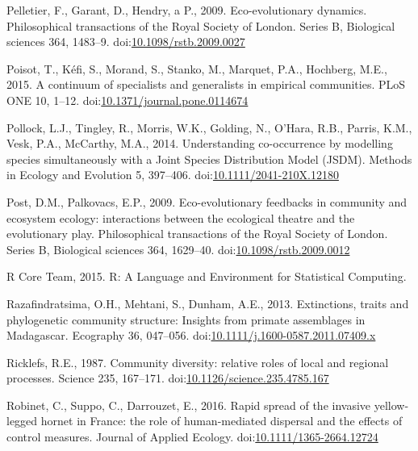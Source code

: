 \hypertarget{ref-Pelletier2009}{}
Pelletier, F., Garant, D., Hendry, a P., 2009. Eco-evolutionary
dynamics. Philosophical transactions of the Royal Society of London.
Series B, Biological sciences 364, 1483--9.
doi:\href{https://doi.org/10.1098/rstb.2009.0027}{10.1098/rstb.2009.0027}

\hypertarget{ref-Poisot2015c}{}
Poisot, T., Kéfi, S., Morand, S., Stanko, M., Marquet, P.A., Hochberg,
M.E., 2015. A continuum of specialists and generalists in empirical
communities. PLoS ONE 10, 1--12.
doi:\href{https://doi.org/10.1371/journal.pone.0114674}{10.1371/journal.pone.0114674}

\hypertarget{ref-Pollock2014}{}
Pollock, L.J., Tingley, R., Morris, W.K., Golding, N., O'Hara, R.B.,
Parris, K.M., Vesk, P.A., McCarthy, M.A., 2014. Understanding
co-occurrence by modelling species simultaneously with a Joint Species
Distribution Model (JSDM). Methods in Ecology and Evolution 5, 397--406.
doi:\href{https://doi.org/10.1111/2041-210X.12180}{10.1111/2041-210X.12180}

\hypertarget{ref-Post2009}{}
Post, D.M., Palkovacs, E.P., 2009. Eco-evolutionary feedbacks in
community and ecosystem ecology: interactions between the ecological
theatre and the evolutionary play. Philosophical transactions of the
Royal Society of London. Series B, Biological sciences 364, 1629--40.
doi:\href{https://doi.org/10.1098/rstb.2009.0012}{10.1098/rstb.2009.0012}

\hypertarget{ref-Rcoreteam2015}{}
R Core Team, 2015. R: A Language and Environment for Statistical
Computing.

\hypertarget{ref-Razafindratsima2013}{}
Razafindratsima, O.H., Mehtani, S., Dunham, A.E., 2013. Extinctions,
traits and phylogenetic community structure: Insights from primate
assemblages in Madagascar. Ecography 36, 047--056.
doi:\href{https://doi.org/10.1111/j.1600-0587.2011.07409.x}{10.1111/j.1600-0587.2011.07409.x}

\hypertarget{ref-Ricklefs1987}{}
Ricklefs, R.E., 1987. Community diversity: relative roles of local and
regional processes. Science 235, 167--171.
doi:\href{https://doi.org/10.1126/science.235.4785.167}{10.1126/science.235.4785.167}

\hypertarget{ref-Robinet2016}{}
Robinet, C., Suppo, C., Darrouzet, E., 2016. Rapid spread of the
invasive yellow-legged hornet in France: the role of human-mediated
dispersal and the effects of control measures. Journal of Applied
Ecology.
doi:\href{https://doi.org/10.1111/1365-2664.12724}{10.1111/1365-2664.12724}

